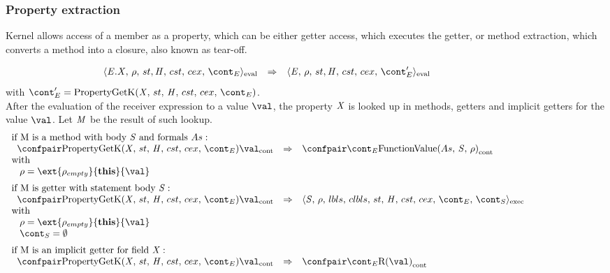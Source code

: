 \documentclass{article}
\begin{document}
\subsubsection{Property extraction}
\label{subsubsec:property-extraction}
Kernel allows access of a member as a property, which can be either getter access, which executes the getter, or method extraction, which converts a method into a closure, also known as tear-off.
\newcommand{\PropertyGetK}{\mathrm{PropertyGetK}(\idmeta,\,\strace,\,\handler,\,\cstrace,\,\cex,\,\econt)}

\[
  \begin{array}{lcl@{\hspace{30mm}}}
	\cesktrans{
		\evalconf{\PropertyGet{\expressionmeta}{\idmeta}}{\env}{\strace}{\cstrace}{\cex}{\econt}}{
		\evalconf{\expressionmeta}{\env}{\strace}{\cstrace}{\cex}{\econt'}}
  \end{array}
\]
with $\econt' = \PropertyGetK$.\\

\noindent
After the evaluation of the receiver expression to a value $\val$, the property $\mathit{X}$ is looked up in methods, getters and implicit getters for the value $\val$. Let $\mathit{M}$ be the result of such lookup.
\[
  \begin{array}{lcl@{\hspace{30mm}}}
	\textrm{if M is a method with body }\stmt\textrm{ and formals }\formals :\\
	\hspace{2mm}
	\cesktrans{
		\contconf{\PropertyGetK}{\val}}{
		\contconf{\econt}{\funval{\formals}{\stmt}{\env}}}\\
	\textrm{with}\\
	\hspace{3mm}
	\env = \ext{\env_{empty}}{\mathbf{this}}{\val}\\[2mm]

	\textrm{if M is getter with statement body }\stmt :\\
	\hspace{2mm}
	\cesktrans{
		\contconf{\PropertyGetK}{\val}}{
		\execconf{\stmt}{\env}{\lbls}{\clbls}{\handler}{\cstrace}{\cex}{\econt}{\scont}
		}\\
	\textrm{with}\\
	\hspace{3mm}
	\env = \ext{\env_{empty}}{\mathbf{this}}{\val}\\
	\hspace{3mm}
	\scont = \emptyset\\[2mm]

	\textrm{if M is an implicit getter for field }\idmeta :\\
	\hspace{2mm}
	\cesktrans{
		\contconf{\PropertyGetK}{\val}}{
		\contconf{\econt}{\textrm{R}(\val)}}
  \end{array}
\]
\end{document}
